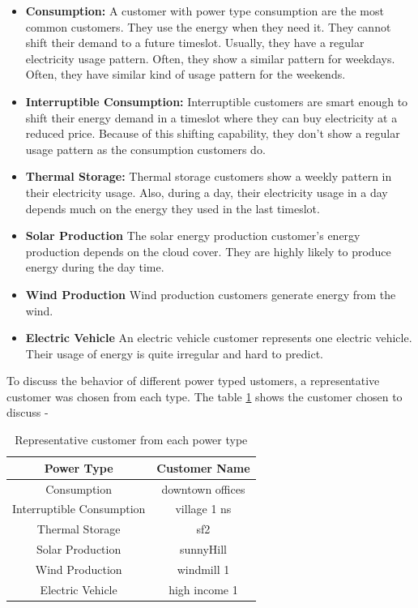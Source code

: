 \begin{itemize}
\item \textbf{Consumption: } A customer with power type consumption are the most common customers. They use the energy when they need it. They cannot shift their demand to a future timeslot. Usually, they have a regular electricity usage pattern. Often, they show a similar pattern for weekdays. Often, they have similar kind of usage pattern for the weekends. 



\item \textbf{Interruptible Consumption: }
Interruptible customers are smart enough to shift their energy demand in a timeslot where they can buy electricity at a reduced price. Because of this shifting capability, they don't show a regular usage pattern as the consumption customers do. 

\item \textbf{Thermal Storage: }
Thermal storage customers show a weekly pattern in their electricity usage. Also, during a day, their electricity usage in a day depends  much on the energy they used in the last timeslot. 


\item \textbf{Solar Production}
The solar energy production customer's energy production depends on the cloud cover. They are highly likely to produce energy during the day time.

\item\textbf{Wind Production} Wind production customers generate energy from the wind.
\item \textbf{Electric Vehicle} An electric vehicle customer represents one electric vehicle. Their usage of energy is quite irregular and hard to predict. \\
\end{itemize}

 To discuss the behavior of different power typed ustomers, a representative customer was chosen from each type. The table \ref{table:repCust} shows the customer chosen to discuss -

\begin{table}
\centering
\begin{tabular}{ |c|c| } 
\hline
Power Type & Customer Name \\
\hline
Consumption & downtown offices \\ 
Interruptible Consumption & village 1 ns \\ 
Thermal Storage & sf2 \\ 
Solar Production & sunnyHill \\ 
Wind Production & windmill 1 \\ 
Electric Vehicle & high income 1 \\ 
\hline
\end{tabular}
\caption{Representative customer from each power type}
\label{table:repCust}
\end{table}

